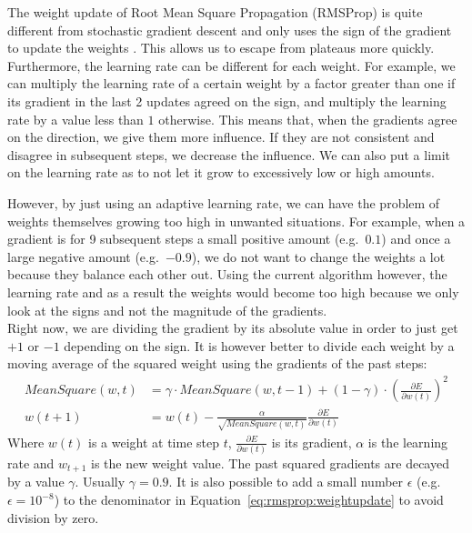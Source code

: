 The weight update of Root Mean Square Propagation (RMSProp) is quite different from stochastic gradient descent and only uses the sign of the gradient to update the weights \parencite{Tieleman2012LectureMagnitude.}.
This allows us to escape from plateaus more quickly. Furthermore, the learning rate can be different for each weight.
For example, we can multiply the learning rate of a certain weight by a factor greater than one if its gradient in the last 2 updates agreed on the sign, and multiply the learning rate by a value less than $1$ otherwise.
This means that, when the gradients agree on the direction, we give them more influence.
If they are not consistent and disagree in subsequent steps, we decrease the influence. We can also put a limit on the learning rate as to not let it grow to excessively low or high amounts.

However, by just using an adaptive learning rate, we can have the problem of weights themselves growing too high in unwanted situations. For example, when a gradient is for 9 subsequent steps a small positive amount (e.g.\ $0.1$) and once a large negative amount (e.g.\ $-0.9$), we do not want to change the weights a lot because they balance each other out.
Using the current algorithm however, the learning rate and as a result the weights would become too high because we only look at the signs and not the magnitude of the gradients.\\
Right now, we are dividing the gradient by its absolute value in order to just get $+1$ or $-1$ depending on the sign. It is however better to divide each weight by a moving average of the squared weight using the gradients of the past steps:
\begin{subequations}
\label{eq:rmsprop}
\begin{align}
MeanSquare(w, t) &= \gamma \cdot MeanSquare(w, t-1) + (1 - \gamma) \cdot \left (\frac{\partial E}{\partial w(t)} \right )^2 \\
w(t+1) &= w(t) - \frac{\alpha}{\sqrt{MeanSquare(w,t)}}\frac{\partial E}{\partial w(t)} \label{eq:rmsprop:weightupdate}
\end{align}
\end{subequations}
Where $w(t)$ is a weight at time step $t$, $\frac{\partial E}{\partial w(t)}$ is its gradient, $\alpha$ is the learning rate and $w_{t+1}$ is the new weight value. The past squared gradients are decayed by a value $\gamma$. Usually $\gamma=0.9$. It is also possible to add a small number $\epsilon$ (e.g.\ $\epsilon = 10^{-8}$) to the denominator in Equation~\ref{eq:rmsprop:weightupdate} to avoid division by zero.\\


